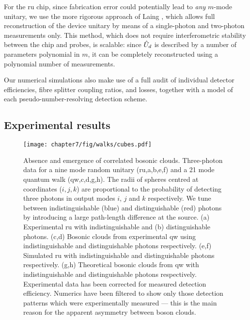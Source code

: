For the \gls{ru} chip, since fabrication error could potentially lead to \emph{any} $m$-mode unitary, we use the more rigorous approach of Laing \cite{Laing2012a}, which allows full reconstruction of the device unitary by means of a single-photon and two-photon measurements only. This method, which does not require interferometric stability between the chip and probes, is scalable: since $\hat{U}_d$ is described by a number of parameters polynomial in $m$, it can be completely reconstructed using a polynomial number of measurements.

Our numerical simulations also make use of a full audit of individual detector efficiencies, fibre splitter coupling ratios, and losses, together with a model of each pseudo-number-resolving detection scheme.

\subsection{Experimental results} 
\begin{figure}[t!]
\centering
\texttt{[image: chapter7/fig/walks/cubes.pdf]}
\caption[Clouding of 3 photons in 9-mode and 21-mode interferometers]{Absence and emergence of correlated bosonic clouds. Three-photon data for a nine mode random unitary (\acrshort{ru},a,b,e,f) and a 21 mode quantum walk (\acrshort{qw},c,d,g,h).  The radii of spheres centred at coordinates ($i,j,k$) are proportional to the probability of detecting three photons in output modes $i$, $j$ and $k$ respectively.  We tune between indistinguishable (blue) and distinguishable (red) photons by introducing a large path-length difference at the source.  (a) Experimental \gls{ru} with indistinguishable and (b) distinguishable photons.  (c,d) Bosonic clouds from experimental \gls{qw} using indistinguishable and distinguishable photons respectively. (e,f)  Simulated \gls{ru} with indistinguishable and distinguishable photons respectively.  (g,h) Theoretical bosonic clouds from \gls{qw} with indistinguishable and distinguishable photons respectively.
Experimental data has been corrected for measured detection efficiency. Numerics have been filtered to show only those detection patterns which were experimentally measured --- this is the main reason for the apparent asymmetry between boson clouds.  }
\label{fig:multiphoton-cubes}
\end{figure}

